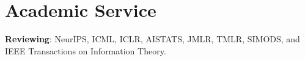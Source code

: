 \documentclass[10pt]{article}
\newcommand{\spacing}{\vspace{0.5cm}}
\begin{document}
\spacing

%

\section{Academic Service}

\vspace{1ex}

\textbf{Reviewing}:
NeurIPS, ICML, ICLR, AISTATS, JMLR, TMLR, SIMODS, and IEEE Transactions on Information Theory.
\end{document}
